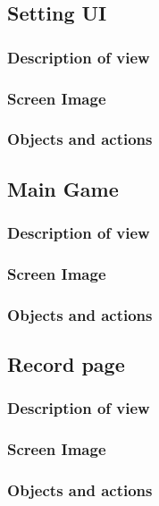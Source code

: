\documentclass[11pt]{article}
\begin{document}
\subsection{Setting UI}
\subsubsection{Description of view}
\subsubsection{Screen Image}
\subsubsection{Objects and actions}

\subsection{Main Game}
\subsubsection{Description of view}
\subsubsection{Screen Image}
\subsubsection{Objects and actions}

\subsection{Record page}
\subsubsection{Description of view}
\subsubsection{Screen Image}
\subsubsection{Objects and actions}
\end{document}
